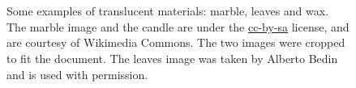 \begin{figure}
\centering
{}
\\
\\
\caption{Some examples of translucent materials: marble, leaves and wax. The marble image and the candle are under the \href{http://creativecommons.org/licenses/by-sa/2.0/deed.en}{cc-by-sa} license, and are courtesy of Wikimedia Commons. The two images were cropped to fit the document. The leaves image was taken by Alberto Bedin and is used with permission.}
\label{fig:ex1}
\end{figure}

